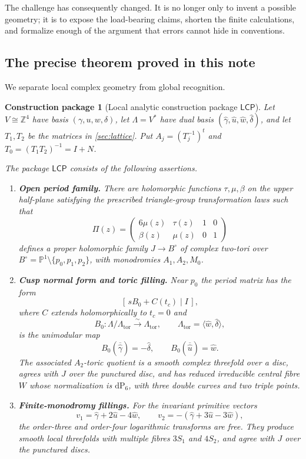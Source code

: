\documentclass[11pt,reqno]{amsart}
\numberwithin{equation}{section}
\newcommand{\Z}{\mathbb Z}
\newcommand{\Pone}{\mathbb P^1}
\newcommand{\dP}{\mathrm{dP}_6}
\newcommand{\wideg}{\widehat\gamma}
\newcommand{\wideu}{\widehat u}
\newcommand{\widew}{\widehat w}
\newcommand{\wided}{\widehat\delta}
\newcommand{\LambdaTor}{\Lambda_{\mathrm{tor}}}
\newcommand{\LCP}{\mathsf{LCP}}
\newtheorem{construction}[theorem]{Construction package}
\theoremstyle{definition}
\begin{document}
The challenge has consequently changed. It is no longer only to invent a possible geometry; it is to expose the load-bearing claims, shorten the finite calculations, and formalize enough of the argument that errors cannot hide in conventions.

\subsection{The precise theorem proved in this note}

We separate local complex geometry from global recognition.

\begin{construction}[Local analytic construction package $\LCP$]\label{pkg:lcp}
Let $V\cong\Z^4$ have basis $(\gamma,u,w,\delta)$, let $\Lambda=V^*$ have dual basis $(\wideg,\wideu,\widew,\wided)$, and let $T_1,T_2$ be the matrices in \cref{sec:lattice}. Put $A_j=(T_j^{-1})^t$ and $T_0=(T_1T_2)^{-1}=I+N$.

The package $\LCP$ consists of the following assertions.
\begin{enumerate}[label=\textup{(L\arabic*)}]
\item \textbf{Open period family.} There are holomorphic functions $\tau,\mu,\beta$ on the upper half-plane satisfying the prescribed triangle-group transformation laws such that
\[
 \Pi(z)=
 \begin{pmatrix}
 6\mu(z)&\tau(z)&1&0\\
 \beta(z)&\mu(z)&0&1
 \end{pmatrix}
\]
defines a proper holomorphic family $J\to B^\circ$ of complex two-tori over
$B^\circ=\Pone\setminus\{p_0,p_1,p_2\}$, with monodromies $A_1,A_2,M_0$.

\item \textbf{Cusp normal form and toric filling.} Near $p_0$ the period matrix has the form
\[
 [\,sB_0+C(t_c)\mid I\,],
\]
where $C$ extends holomorphically to $t_c=0$ and
\[
 B_0:\Lambda/\LambdaTor\xrightarrow{\sim}\LambdaTor,
 \qquad
 \LambdaTor=\langle\widew,\wided\rangle,
\]
is the unimodular map
\[
 B_0(\overline{\wideg})=-\wided,
 \qquad
 B_0(\overline{\wideu})=\widew.
\]
The associated $A_2$-toric quotient is a smooth complex threefold over a disc, agrees with $J$ over the punctured disc, and has reduced irreducible central fibre $W$ whose normalization is $\dP$, with three double curves and two triple points.

\item \textbf{Finite-monodromy fillings.} For the invariant primitive vectors
\[
 v_1=\wideg+2\wideu-4\widew,
 \qquad
 v_2=-(\wideg+3\wideu-3\widew),
\]
the order-three and order-four logarithmic transforms are free. They produce smooth local threefolds with multiple fibres $3S_1$ and $4S_2$, and agree with $J$ over the punctured discs.


\end{enumerate}
\end{construction}
\end{document}
